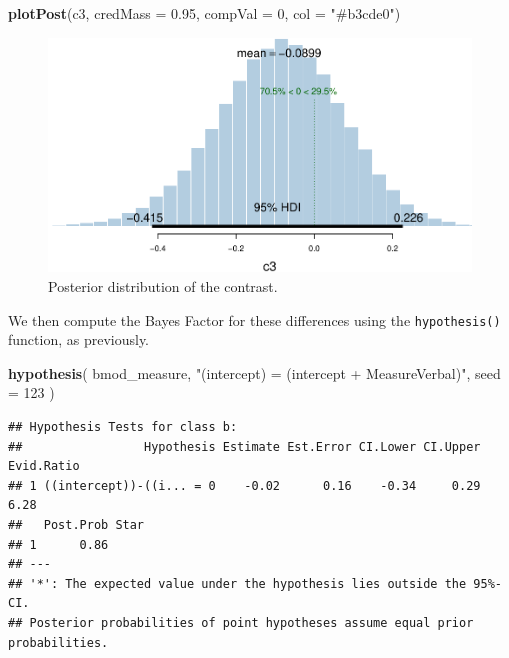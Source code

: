 \documentclass[floatsintext,doc]{apa6}
\newenvironment{Shaded}{\begin{snugshade}}{\end{snugshade}}
\newcommand{\DataTypeTok}[1]{\textcolor[rgb]{0.13,0.29,0.53}{#1}}
\newcommand{\DecValTok}[1]{\textcolor[rgb]{0.00,0.00,0.81}{#1}}
\newcommand{\FloatTok}[1]{\textcolor[rgb]{0.00,0.00,0.81}{#1}}
\newcommand{\KeywordTok}[1]{\textcolor[rgb]{0.13,0.29,0.53}{\textbf{#1}}}
\newcommand{\NormalTok}[1]{#1}
\newcommand{\StringTok}[1]{\textcolor[rgb]{0.31,0.60,0.02}{#1}}
\begin{document}
\begin{Shaded}
\begin{Highlighting}[]
\KeywordTok{plotPost}\NormalTok{(c3, }\DataTypeTok{credMass =} \FloatTok{0.95}\NormalTok{, }\DataTypeTok{compVal =} \DecValTok{0}\NormalTok{, }\DataTypeTok{col =} \StringTok{"#b3cde0"}\NormalTok{)}
\end{Highlighting}
\end{Shaded}

\begin{figure}[H]

{\centering \includegraphics[width=0.75\linewidth]{supplementary_materials_files/figure-latex/unnamed-chunk-25-2} 

}

\caption{Posterior distribution of the contrast.}\label{fig:unnamed-chunk-252}
\end{figure}

We then compute the Bayes Factor for these differences using the \texttt{hypothesis()} function, as previously.

\begin{Shaded}
\begin{Highlighting}[]
\KeywordTok{hypothesis}\NormalTok{(}
\NormalTok{    bmod_measure, }\StringTok{"(intercept) = (intercept + MeasureVerbal)"}\NormalTok{,}
    \DataTypeTok{seed =} \DecValTok{123}
\NormalTok{    )}
\end{Highlighting}
\end{Shaded}

\begin{verbatim}
## Hypothesis Tests for class b:
##                 Hypothesis Estimate Est.Error CI.Lower CI.Upper Evid.Ratio
## 1 ((intercept))-((i... = 0    -0.02      0.16    -0.34     0.29       6.28
##   Post.Prob Star
## 1      0.86     
## ---
## '*': The expected value under the hypothesis lies outside the 95%-CI.
## Posterior probabilities of point hypotheses assume equal prior probabilities.
\end{verbatim}
\end{document}
